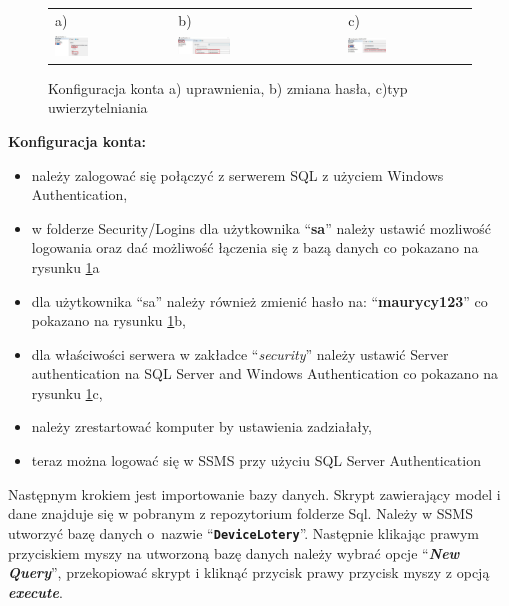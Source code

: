 \begin{figure}[htb]
  \centering
	\begin{tabular}{@{}lll@{}}
	a) & b) & c) \\
  \includegraphics[width=0.300\textwidth]{rysA/status.pdf} & 
	\includegraphics[width=0.333\textwidth]{rysA/general.pdf} &
	\includegraphics[width=0.320\textwidth]{rysA/enable.pdf}
	\end{tabular}
  \caption{Konfiguracja konta a) uprawnienia, b) zmiana hasła, c)typ uwierzytelniania }
  \label{sa:label}
\end{figure}

\newpage
\textbf{Konfiguracja konta:}
\begin{itemize}
\item należy zalogować się połączyć z serwerem SQL z użyciem Windows Authentication,
\item w folderze Security/Logins dla użytkownika "`\textbf{sa}"' należy ustawić mozliwość logowania oraz dać możliwość łączenia się z bazą danych co pokazano na rysunku \ref{sa:label}a
\item dla użytkownika "`sa"' należy również zmienić hasło na: "`\textbf{maurycy123}"' co pokazano na rysunku \ref{sa:label}b,
\item dla właściwości serwera w zakładce "`\emph{security}"' należy ustawić Server authentication na SQL Server and Windows Authentication co pokazano na rysunku \ref{sa:label}c, 
\item należy zrestartować komputer by ustawienia zadziałały,
\item teraz można logować się w SSMS przy użyciu SQL Server Authentication
\end{itemize}

Następnym krokiem jest importowanie bazy danych. Skrypt zawierający model i dane znajduje się w pobranym z repozytorium folderze Sql. Należy w SSMS utworzyć bazę danych o~nazwie "`\textbf{\texttt{DeviceLotery}}"'. Następnie klikając prawym przyciskiem myszy na utworzoną bazę danych należy wybrać opcje "`\textbf{\emph{New Query}}"', przekopiować skrypt i kliknąć przycisk prawy przycisk myszy z opcją \textbf{\emph{execute}}.


